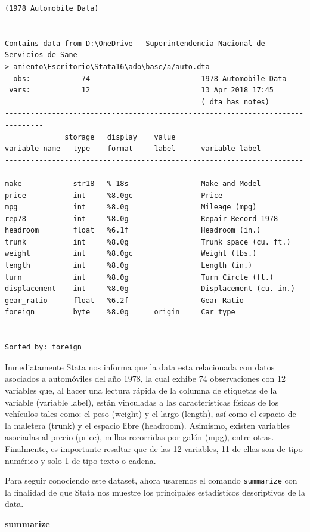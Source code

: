 \documentclass[
]{book}
\newenvironment{Shaded}{\begin{snugshade}}{\end{snugshade}}
\newcommand{\KeywordTok}[1]{\textcolor[rgb]{0.13,0.29,0.53}{\textbf{#1}}}
\theoremstyle{definition}
\theoremstyle{definition}
\theoremstyle{definition}
\theoremstyle{definition}
\theoremstyle{remark}
\begin{document}
\begin{verbatim}
(1978 Automobile Data)


Contains data from D:\OneDrive - Superintendencia Nacional de Servicios de Sane
> amiento\Escritorio\Stata16\ado\base/a/auto.dta
  obs:            74                          1978 Automobile Data
 vars:            12                          13 Apr 2018 17:45
                                              (_dta has notes)
-------------------------------------------------------------------------------
              storage   display    value
variable name   type    format     label      variable label
-------------------------------------------------------------------------------
make            str18   %-18s                 Make and Model
price           int     %8.0gc                Price
mpg             int     %8.0g                 Mileage (mpg)
rep78           int     %8.0g                 Repair Record 1978
headroom        float   %6.1f                 Headroom (in.)
trunk           int     %8.0g                 Trunk space (cu. ft.)
weight          int     %8.0gc                Weight (lbs.)
length          int     %8.0g                 Length (in.)
turn            int     %8.0g                 Turn Circle (ft.)
displacement    int     %8.0g                 Displacement (cu. in.)
gear_ratio      float   %6.2f                 Gear Ratio
foreign         byte    %8.0g      origin     Car type
-------------------------------------------------------------------------------
Sorted by: foreign
\end{verbatim}

Inmediatamente Stata nos informa que la data esta relacionada con datos asociados a automóviles del año 1978, la cual exhibe 74 observaciones con 12 variables que, al hacer una lectura rápida de la columna de etiquetas de la variable (variable label), están vinculadas a las características físicas de los vehículos tales como: el peso (weight) y el largo (length), así como el espacio de la maletera (trunk) y el espacio libre (headroom). Asimismo, existen variables asociadas al precio (price), millas recorridas por galón (mpg), entre otras. Finalmente, es importante resaltar que de las 12 variables, 11 de ellas son de tipo numérico y solo 1 de tipo texto o cadena.

Para seguir conociendo este dataset, ahora usaremos el comando \texttt{summarize} con la finalidad de que Stata nos muestre los principales estadísticos descriptivos de la data.

\begin{Shaded}
\begin{Highlighting}[]
\KeywordTok{summarize}
\end{Highlighting}
\end{Shaded}
\end{document}
